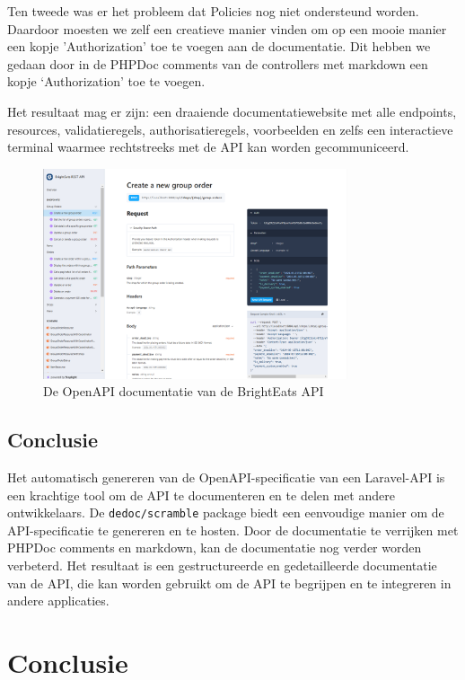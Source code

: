 \bigskip

Ten tweede was er het probleem dat Policies nog niet ondersteund worden. Daardoor moesten we zelf een creatieve manier vinden om op een mooie manier een kopje 'Authorization' toe te voegen aan de documentatie. Dit hebben we gedaan door in de PHPDoc comments van de controllers met markdown een kopje `Authorization' toe te voegen.

\bigskip

Het resultaat mag er zijn: een draaiende documentatiewebsite met alle endpoints, resources, validatieregels, authorisatieregels, voorbeelden en zelfs een interactieve terminal waarmee rechtstreeks met de API kan worden gecommuniceerd.

\begin{figure}[H]
\centering
\includegraphics[width=0.8\textwidth]{scramble.png}
\caption{De OpenAPI documentatie van de Bright\-Eats API}
\label{fig:openapi}
\end{figure}

\subsection{Conclusie}

Het automatisch genereren van de OpenAPI-specificatie van een Laravel-API is een krachtige tool om de API te documenteren en te delen met andere ontwikkelaars. De \texttt{dedoc/scramble} package biedt een eenvoudige manier om de API-specificatie te genereren en te hosten. Door de documentatie te verrijken met PHPDoc comments en markdown, kan de documentatie nog verder worden verbeterd. Het resultaat is een gestructureerde en gedetailleerde documentatie van de API, die kan worden gebruikt om de API te begrijpen en te integreren in andere applicaties.

\section{Conclusie}

